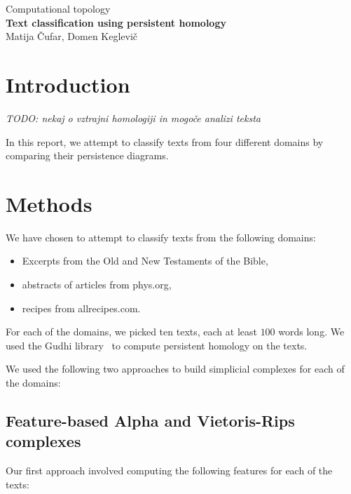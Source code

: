 \documentclass[12pt,a4paper]{amsart}
\begin{document}
\thispagestyle{empty}
\begin{center}{\large
Computational topology\\[4mm]
{\bf Text classification using persistent homology}\\[4mm]
Matija Čufar, Domen Keglevič\\[6mm]
}
\end{center}
\bigskip

\section{Introduction}

\emph{TODO: nekaj o vztrajni homologiji in mogoče analizi teksta}

In this report, we attempt to classify texts from four different domains by
comparing their persistence diagrams.

\section{Methods}

We have chosen to attempt to classify texts from the following domains:

\begin{itemize}
\item Excerpts from the Old and New Testaments of the Bible,
\item abstracts of articles from phys.org,
\item recipes from allrecipes.com.
\end{itemize}

For each of the domains, we picked ten texts, each at least $100$ words long. We
used the Gudhi library~\cite{maria2014gudhi} to compute persistent homology on
the texts.

We used the following two approaches to build simplicial complexes for each of
the domains:

\subsection{Feature-based Alpha and Vietoris-Rips complexes}

Our first approach involved computing the following features for each of the
texts:
\end{document}
